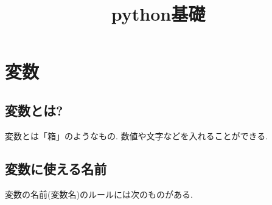 \documentclass{jsarticle}
\title{python基礎}
\date{} %
\author{}
\begin{document}
\maketitle

\vspace{-20mm}

\section{変数}
\subsection{変数とは?}
変数とは「箱」のようなもの. 数値や文字などを入れることができる.

\subsection{変数に使える名前}
変数の名前(変数名)のルールには次のものがある.
\end{document}
